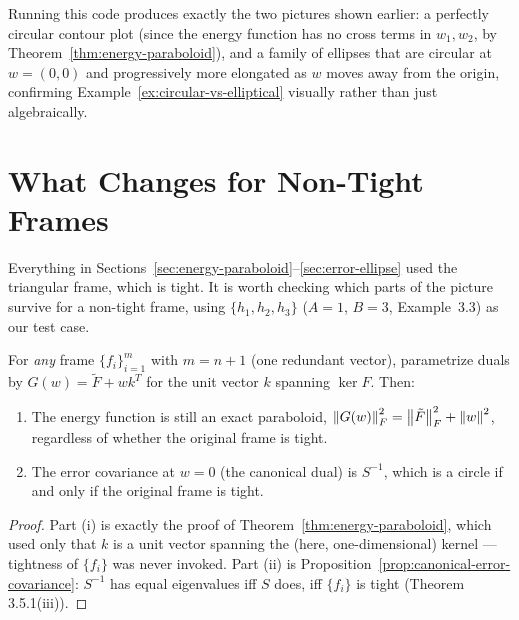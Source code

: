\begin{remark*}
Running this code produces exactly the two pictures shown earlier: a
perfectly circular contour plot (since the energy function has no cross
terms in $w_1, w_2$, by Theorem~\ref{thm:energy-paraboloid}), and a
family of ellipses that are circular at $w=(0,0)$ and progressively more
elongated as $w$ moves away from the origin, confirming
Example~\ref{ex:circular-vs-elliptical} visually rather than just
algebraically.
\end{remark*}

\section{What Changes for Non-Tight Frames}
\label{sec:nontight-geometry}

Everything in Sections~\ref{sec:energy-paraboloid}--\ref{sec:error-ellipse}
used the triangular frame, which is tight. It is worth checking which
parts of the picture survive for a non-tight frame, using
$\{h_1,h_2,h_3\}$ ($A=1$, $B=3$, Example~3.3) as our test case.

\begin{proposition}
\label{prop:nontight-geometry}
For \emph{any} frame $\{f_i\}_{i=1}^m$ with $m=n+1$ (one redundant
vector), parametrize duals by $G(w)=\tilde F+wk^T$ for the unit vector
$k$ spanning $\ker F$. Then:
\begin{enumerate}[label=(\roman*)]
  \item The energy function is still an exact paraboloid,
        $\left\| G(w) \right\|_F^2=\left\| \tilde F \right\|_F^2+\left\| w \right\|^2$, regardless of
        whether the original frame is tight.
  \item The error covariance at $w=0$ (the canonical dual) is $S^{-1}$,
        which is a circle if and only if the original frame is tight.
\end{enumerate}
\end{proposition}

\begin{proof}
Part (i) is exactly the proof of Theorem~\ref{thm:energy-paraboloid},
which used only that $k$ is a unit vector spanning the (here,
one-dimensional) kernel --- tightness of $\{f_i\}$ was never invoked.
Part (ii) is Proposition~\ref{prop:canonical-error-covariance}: $S^{-1}$
has equal eigenvalues iff $S$ does, iff $\{f_i\}$ is tight (Theorem
3.5.1(iii)).
\end{proof}

